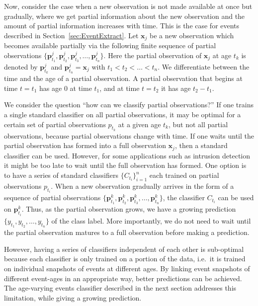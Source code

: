 \documentclass[a4paper,11pt]{article}
\begin{document}
Now, consider the case when a new observation is not made available at once but gradually, where we get partial information about the new observation and the amount of partial information increases with time. This is the case for events described in Section~\ref{sec:EventExtract}. Let $\bm{x}_j$ be a new observation which becomes available partially via the following finite sequence of partial observations $\{\bm{p}^j_{t_1},\bm{p}^j_{t_2}, \bm{p}^j_{t_3}, \dots, \bm{p}^j_{t_n}\}$. Here the partial observation of $\bm{x}_j$ at age $t_k$ is denoted by $\bm{p}^j_{t_k}$ and $\bm{p}^j_{t_n} = \bm{x}_j$ with $t_1 < t_2 < \dots < t_n$. We differentiate between the time and the age of a partial observation. A partial observation that begins at time $t =t_1$ has age $0$ at time $t_1$, and at time $t = t_2$ it has age $t_2 - t_1$.

We consider the question ``how can we classify partial observations?'' If one trains a single standard classifier on all partial observations, it may be optimal for a certain set of partial observations $p_{t_k}$ at a given age $t_k$, but not all partial observations, because partial observations change with time. If one waits until the partial observation has formed into a full observation $\bm{x}_j$, then a standard classifier can be used. However, for some applications such as intrusion detection it might be too late to wait until the full observation has formed. One option is to have a series of standard classifiers $\{C_{t_i}\}_{i=1}^n$ each trained on partial observations $p_{t_i}$. When a new observation gradually arrives in the form of a sequence of partial observations $\{\bm{p}^k_{t_1},\bm{p}^k_{t_2}, \bm{p}^k_{t_3}, \dots, \bm{p}^k_{t_n}\}$, the classifier $C_{t_i}$ can be used on $\bm{p}^k_{t_i}$. Thus, as the partial observation grows, we have a growing prediction $\{y_{t_1}, y_{t_2}, \dots, y_{t_n}\}$ of the class label. More importantly, we do not need to wait until the partial observation matures to a full observation before making a prediction.

However, having a series of classifiers independent of each other is sub-optimal because each classifier is only trained on a portion of the data, i.e.\ it is trained on  individual snapshots of events at different ages. By linking event snapshots of different event-ages in an appropriate way,  better predictions can be achieved. The age-varying events classifier described in the next section addresses this limitation, while giving a growing prediction.

\end{document}

